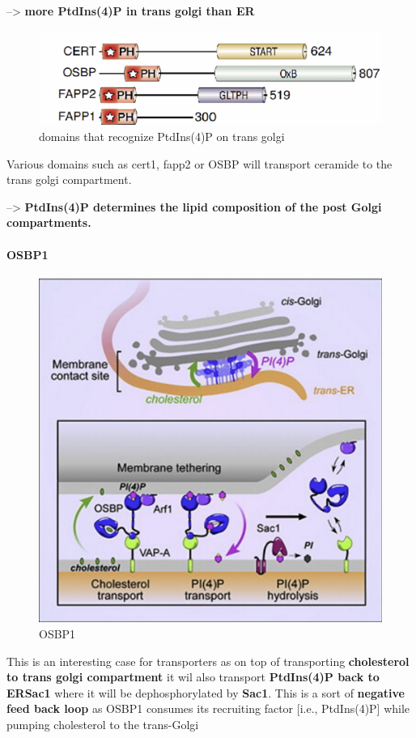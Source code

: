 \documentclass[../main.tex]{subfiles}
\begin{document}
--> \textbf{more PtdIns(4)P in trans golgi than ER}
\begin{figure}[H]
    \centering
    \includegraphics[width=0.5\linewidth]{moreDomainShit.png}
    \caption{domains that recognize PtdIns(4)P on trans golgi}
    \label{fig:enter-label}
\end{figure}
Various domains such as \gls{cert1}, \gls{fapp2} or \gls{OSBP} will transport ceramide to the trans golgi compartment.

-->  \textbf{PtdIns(4)P determines the lipid 
composition of the post Golgi compartments. }
\paragraph{OSBP1}
\begin{figure}[H]
    \centering
    \includegraphics[width=0.5\linewidth]{OSBP1.png}
    \caption{OSBP1}
    \label{fig:enter-label}
\end{figure}
This is an interesting case for transporters as on top of transporting \textbf{cholesterol to trans golgi compartment} it wil also transport \textbf{PtdIns(4)P back to ERSac1} where it will be dephosphorylated by \textbf{\gls{Sac1}}. This is a sort of \textbf{negative feed back loop} as OSBP1  consumes its recruiting factor [i.e., PtdIns(4)P] while 
pumping cholesterol to the trans-Golgi
\end{document}
